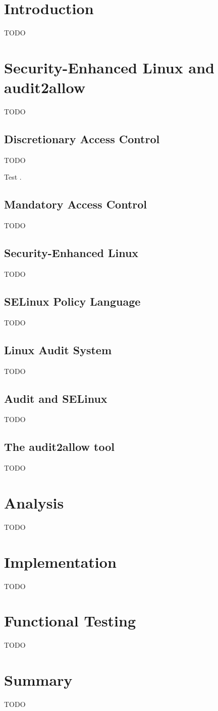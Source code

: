 \chapter{Introduction}
TODO

\chapter{Security-Enhanced Linux and audit2allow}
TODO

\section{Discretionary Access Control}
TODO

Test \cite{tsn}.

\section{Mandatory Access Control}
TODO

\section{Security-Enhanced Linux}
TODO

\section{SELinux Policy Language}
TODO

\section{Linux Audit System}
TODO

\section{Audit and SELinux}
TODO

\section{The audit2allow tool}
TODO

\chapter{Analysis}
TODO

\chapter{Implementation}
TODO

\chapter{Functional Testing}
TODO

\chapter{Summary}
TODO
